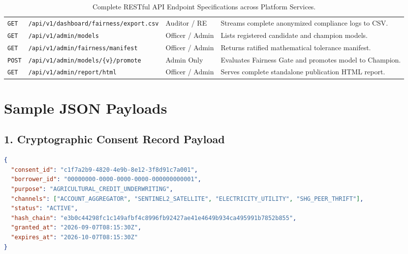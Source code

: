 \begin{table}[H]
\begin{tabularx}{\textwidth}{l p{5.0cm} p{2.2cm} X}
  \texttt{GET} & \texttt{/api/v1/dashboard/fairness/export.csv} & Auditor / RE & Streams complete anonymized compliance logs to CSV. \\
  \addlinespace
  \texttt{GET} & \texttt{/api/v1/admin/models} & Officer / Admin & Lists registered candidate and champion models. \\
  \texttt{GET} & \texttt{/api/v1/admin/fairness/manifest} & Officer / Admin & Returns ratified mathematical tolerance manifest. \\
  \texttt{POST} & \texttt{/api/v1/admin/models/\{v\}/promote} & Admin Only & Evaluates Fairness Gate and promotes model to Champion. \\
  \texttt{GET} & \texttt{/api/v1/admin/report/html} & Officer / Admin & Serves complete standalone publication HTML report. \\
  \bottomrule
\end{tabularx}
\caption{Complete RESTful API Endpoint Specifications across Platform Services.}
\label{tab:api_catalog}
\end{table}

\section{Sample JSON Payloads}

\subsection{1. Cryptographic Consent Record Payload}
\begin{lstlisting}[language=json, caption={Sample Cryptographic Consent Record JSON Payload.}]
{
  "consent_id": "c1f7a2b9-4820-4e9b-8e12-3f8d91c7a001",
  "borrower_id": "00000000-0000-0000-0000-000000000001",
  "purpose": "AGRICULTURAL_CREDIT_UNDERWRITING",
  "channels": ["ACCOUNT_AGGREGATOR", "SENTINEL2_SATELLITE", "ELECTRICITY_UTILITY", "SHG_PEER_THRIFT"],
  "status": "ACTIVE",
  "hash_chain": "e3b0c44298fc1c149afbf4c8996fb92427ae41e4649b934ca495991b7852b855",
  "granted_at": "2026-09-07T08:15:30Z",
  "expires_at": "2026-10-07T08:15:30Z"
}
\end{lstlisting}

